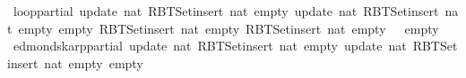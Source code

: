 \begin{isabellebody}
\ {\isachardoublequoteopen}loop{\isacharprime}{\kern0pt}{\isacharunderscore}{\kern0pt}partial\ {\isacharparenleft}{\kern0pt}update\ {\isacharparenleft}{\kern0pt}{}{\isacharcolon}{\kern0pt}{\isacharcolon}{\kern0pt}nat{\isacharparenright}{\kern0pt}\ {\isacharparenleft}{\kern0pt}RBT{\isacharunderscore}{\kern0pt}Set{\isachardot}{\kern0pt}insert\ {\isacharparenleft}{\kern0pt}{}{\isacharcolon}{\kern0pt}{\isacharcolon}{\kern0pt}nat{\isacharparenright}{\kern0pt}\ empty{\isacharparenright}{\kern0pt}\ {\isacharparenleft}{\kern0pt}update\ {\isacharparenleft}{\kern0pt}{}{\isacharcolon}{\kern0pt}{\isacharcolon}{\kern0pt}nat{\isacharparenright}{\kern0pt}\ {\isacharparenleft}{\kern0pt}RBT{\isacharunderscore}{\kern0pt}Set{\isachardot}{\kern0pt}insert\ {\isacharparenleft}{\kern0pt}{}{\isacharcolon}{\kern0pt}{\isacharcolon}{\kern0pt}nat{\isacharparenright}{\kern0pt}\ empty{\isacharparenright}{\kern0pt}\ empty{\isacharparenright}{\kern0pt}{\isacharparenright}{\kern0pt}\ {\isacharparenleft}{\kern0pt}RBT{\isacharunderscore}{\kern0pt}Set{\isachardot}{\kern0pt}insert\ {\isacharparenleft}{\kern0pt}{}{\isacharcolon}{\kern0pt}{\isacharcolon}{\kern0pt}nat{\isacharparenright}{\kern0pt}\ empty{\isacharparenright}{\kern0pt}\ {\isacharparenleft}{\kern0pt}RBT{\isacharunderscore}{\kern0pt}Set{\isachardot}{\kern0pt}insert\ {\isacharparenleft}{\kern0pt}{}{\isacharcolon}{\kern0pt}{\isacharcolon}{\kern0pt}nat{\isacharparenright}{\kern0pt}\ empty{\isacharparenright}{\kern0pt}\ {}\ {}\ empty{\isachardoublequoteclose}\isanewline
{}\isamarkupfalse%
\ {\isachardoublequoteopen}edmonds{\isacharunderscore}{\kern0pt}karp{\isacharunderscore}{\kern0pt}partial\ {\isacharparenleft}{\kern0pt}update\ {\isacharparenleft}{\kern0pt}{}{\isacharcolon}{\kern0pt}{\isacharcolon}{\kern0pt}nat{\isacharparenright}{\kern0pt}\ {\isacharparenleft}{\kern0pt}RBT{\isacharunderscore}{\kern0pt}Set{\isachardot}{\kern0pt}insert\ {\isacharparenleft}{\kern0pt}{}{\isacharcolon}{\kern0pt}{\isacharcolon}{\kern0pt}nat{\isacharparenright}{\kern0pt}\ empty{\isacharparenright}{\kern0pt}\ {\isacharparenleft}{\kern0pt}update\ {\isacharparenleft}{\kern0pt}{}{\isacharcolon}{\kern0pt}{\isacharcolon}{\kern0pt}nat{\isacharparenright}{\kern0pt}\ {\isacharparenleft}{\kern0pt}RBT{\isacharunderscore}{\kern0pt}Set{\isachardot}{\kern0pt}insert\ {\isacharparenleft}{\kern0pt}{}{\isacharcolon}{\kern0pt}{\isacharcolon}{\kern0pt}nat{\isacharparenright}{\kern0pt}\ empty{\isacharparenright}{\kern0pt}\ empty{\isacharparenright}{\kern0pt}{\isacharparenright}{\kern0pt}{\isachardoublequoteclose}%
\endisataginvisible
{\isafoldinvisible}%
%
\isadeliminvisible
\isanewline
%
\endisadeliminvisible
%
\isadelimtheory
\isanewline
%
\endisadelimtheory
%
\isatagtheory
{}\isamarkupfalse%
%
\endisatagtheory
{\isafoldtheory}%
%
\isadelimtheory
%
\endisadelimtheory
%
\end{isabellebody}%
